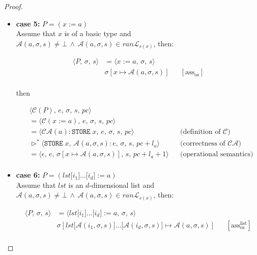 \documentclass{article}
\begin{document}
\begin{proof}
\begin{itemize}
    \item \textbf{case 5:} $P = (x \;\texttt{:=}\; a)$\\

    Assume that $x$ is of a basic type and $\mathcal{A}(a, \sigma, s) \neq \bot \,\land\, \mathcal{A}(a, \sigma, s) \in ran\mathcal{L}_{s(x)}$, then:

    \[
      \begin{aligned}
      \langle P,\, \sigma,\, s \rangle
      &=\langle x \;\texttt{:=}\; a,\, \sigma,\, s \rangle \\
      &\sigma[x \mapsto \mathcal{A}(a, \sigma, s)]
      && [ \text{ass}_{\text{os}} ] \\   
      \end{aligned}
  \]
  
  then

  \[
      \begin{aligned}
      &\langle \mathcal{C}(P),\, e,\, \sigma,\, s,\, pc \rangle \\
      &= \langle \mathcal{C}(x \;\texttt{:=}\; a),\, e,\, \sigma,\, s,\, pc \rangle \\
      &= \langle \mathcal{CA}(a) : \texttt{STORE}\;x ,\, e,\, \sigma,\, s,\, pc \rangle
      && \text{(definition of } \mathcal{C}\text{)} \\   
      &\triangleright^\ast \langle \texttt{STORE}\;x ,\, \mathcal{A}(a, \sigma, s) : e,\, \sigma,\, s,\, pc + l_a \rangle
      && \text{(correctness of } \mathcal{CA}\text{)} \\ 
      &= \langle \epsilon ,\,  e,\, \sigma[x \mapsto \mathcal{A}(a, \sigma, s)],\, s,\, pc + l_a + 1 \rangle
      && \text{(operational semantics)} \\ 
      \end{aligned}
  \]
  \item \textbf{case 6:} $P = (lst\texttt{[$i_1$]}\dots\texttt{[$i_d$]} \;\texttt{:=}\; a)$\\

    Assume that $lst$ is an $d$-dimensional list and $\mathcal{A}(a, \sigma, s) \neq \bot \,\land\, \mathcal{A}(a, \sigma, s) \in ran\mathcal{L}_{s(x)}$, then:

    \[
      \begin{aligned}
      \langle P,\, \sigma,\, s \rangle
      &=\langle lst\texttt{[$i_1$]}\dots\texttt{[$i_d$]} \;\texttt{:=}\; a,\, \sigma,\, s \rangle \\
      &\sigma[lst\texttt{[$\mathcal{A}(i_1, \sigma, s)$]}\dots\texttt{[$\mathcal{A}(i_d, \sigma, s)$]} \mapsto \mathcal{A}(a, \sigma, s)]
      && [ \text{ass}^{\text{list}}_{\text{os}} ] \\   
      \end{aligned}
  \]
  

\end{itemize}
\end{proof}
\end{document}
